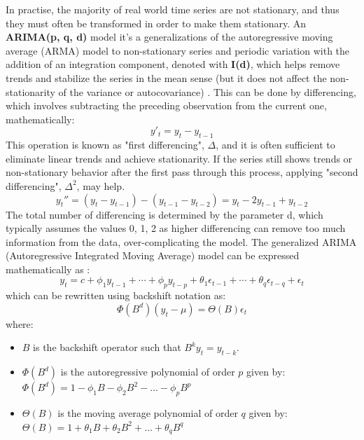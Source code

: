 In practise, the majority of real world time series are not stationary, and thus they must often be transformed in order to make them stationary. An \textbf{ARIMA(p, q, d)} model it's a generalizations of the autoregressive moving average (ARMA) model to non-stationary series and periodic variation with the addition of an integration component, denoted with \textbf{I(d)}, which helps  remove trends and stabilize the series in the mean sense (but it does not affect the non-stationarity of the variance or autocovariance) \cite{chatfield2009}. This can be done by differencing, which involves subtracting the preceding observation from the current one, mathematically:
\begin{equation}
 y'_t = y_t - y_{t-1}
\end{equation}
This operation is known as "first differencing",  \(\Delta\), and it is often sufficient to eliminate linear trends and achieve stationarity. If the series still shows trends or non-stationary behavior after the first pass through this process, applying "second differencing", \(\Delta^2\), may help. 
\begin{equation}
 y_t'' = (y_t - y_{t-1}) - (y_{t-1} - y_{t-2}) = y_t - 2y_{t-1} + y_{t-2}
\end{equation}
The total number of differencing is determined by the parameter d, which typically assumes the values 0, 1, 2 as higher differencing can remove too much information from the data, over-complicating the model. The generalized  ARIMA (Autoregressive Integrated Moving Average) model can be expressed mathematically as \cite{Hung2023}: 
\begin{equation}
y_t = c + \phi_1 y_{t-1} + \cdots + \phi_p y_{t-p} + \theta_1 \epsilon_{t-1} + \cdots + \theta_q \epsilon_{t-q} + \epsilon_t
\label{ARIMA equation}
\end{equation}
which can be rewritten using backshift notation as:
\begin{equation}
\Phi(B^d)(y_t - \mu) = \Theta(B)\epsilon_t
\end{equation}
where: 
\begin{itemize}

    \item \( B \) is the backshift operator such that \( B^k y_t = y_{t-k} \).
    \item \( \Phi(B^d) \) is the autoregressive polynomial of order \( p \) given by: \(\Phi(B^d) = 1 - \phi_1 B - \phi_2 B^2 - \ldots - \phi_p B^p\)
    \item \( \Theta(B) \) is the moving average polynomial of order \( q \) given by: \(\Theta(B) = 1 + \theta_1 B + \theta_2 B^2 + \ldots + \theta_q B^q\)
\end{itemize}

